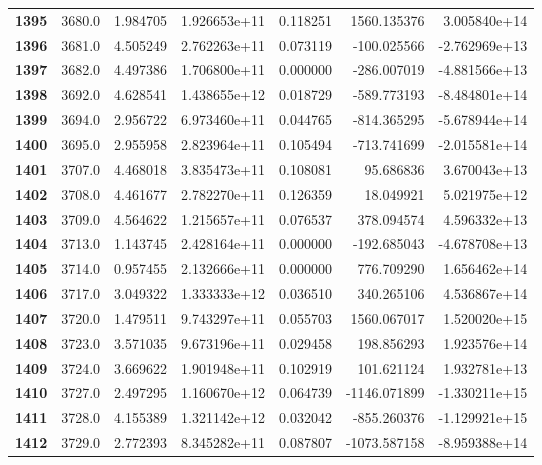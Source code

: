\documentclass{report}[12pt]
\begin{document}
\begin{center}
\begin{tabular}{lrrrrrr}
\textbf{1395} &         3680.0 &   1.984705 &  1.926653e+11 &    0.118251 &  1560.135376 &  3.005840e+14 \\
\textbf{1396} &         3681.0 &   4.505249 &  2.762263e+11 &    0.073119 &  -100.025566 & -2.762969e+13 \\
\textbf{1397} &         3682.0 &   4.497386 &  1.706800e+11 &    0.000000 &  -286.007019 & -4.881566e+13 \\
\textbf{1398} &         3692.0 &   4.628541 &  1.438655e+12 &    0.018729 &  -589.773193 & -8.484801e+14 \\
\textbf{1399} &         3694.0 &   2.956722 &  6.973460e+11 &    0.044765 &  -814.365295 & -5.678944e+14 \\
\textbf{1400} &         3695.0 &   2.955958 &  2.823964e+11 &    0.105494 &  -713.741699 & -2.015581e+14 \\
\textbf{1401} &         3707.0 &   4.468018 &  3.835473e+11 &    0.108081 &    95.686836 &  3.670043e+13 \\
\textbf{1402} &         3708.0 &   4.461677 &  2.782270e+11 &    0.126359 &    18.049921 &  5.021975e+12 \\
\textbf{1403} &         3709.0 &   4.564622 &  1.215657e+11 &    0.076537 &   378.094574 &  4.596332e+13 \\
\textbf{1404} &         3713.0 &   1.143745 &  2.428164e+11 &    0.000000 &  -192.685043 & -4.678708e+13 \\
\textbf{1405} &         3714.0 &   0.957455 &  2.132666e+11 &    0.000000 &   776.709290 &  1.656462e+14 \\
\textbf{1406} &         3717.0 &   3.049322 &  1.333333e+12 &    0.036510 &   340.265106 &  4.536867e+14 \\
\textbf{1407} &         3720.0 &   1.479511 &  9.743297e+11 &    0.055703 &  1560.067017 &  1.520020e+15 \\
\textbf{1408} &         3723.0 &   3.571035 &  9.673196e+11 &    0.029458 &   198.856293 &  1.923576e+14 \\
\textbf{1409} &         3724.0 &   3.669622 &  1.901948e+11 &    0.102919 &   101.621124 &  1.932781e+13 \\
\textbf{1410} &         3727.0 &   2.497295 &  1.160670e+12 &    0.064739 & -1146.071899 & -1.330211e+15 \\
\textbf{1411} &         3728.0 &   4.155389 &  1.321142e+12 &    0.032042 &  -855.260376 & -1.129921e+15 \\
\textbf{1412} &         3729.0 &   2.772393 &  8.345282e+11 &    0.087807 & -1073.587158 & -8.959388e+14 \\

\end{tabular}
\end{center}
\end{document}
